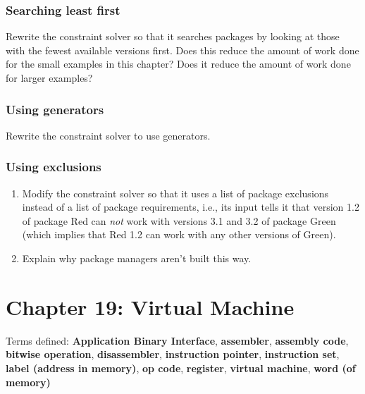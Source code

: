 \documentclass[krantzl]{krantz}
\newcommand{\glossref}[1]{\textbf{#1}}
\begin{document}
\subsection*{Searching least first}


Rewrite the constraint solver so that it searches packages
by looking at those with the fewest available versions first.
Does this reduce the amount of work done for the small examples in this chapter?
Does it reduce the amount of work done for larger examples?

\subsection*{Using generators}


Rewrite the constraint solver to use generators.

\subsection*{Using exclusions}

\begin{enumerate}

\item 

Modify the constraint solver so that
    it uses a list of package exclusions instead of a list of package requirements,
    i.e.,
    its input tells it that version 1.2 of package Red
    can \emph{not} work with versions 3.1 and 3.2 of package Green
    (which implies that Red 1.2 can work with any other versions of Green).



\item 

Explain why package managers aren't built this way.



\end{enumerate}

\chapter{Chapter 19: Virtual Machine}\label{virtual-machine}


\noindent 
    Terms defined:
    \glossref{Application Binary Interface}, \glossref{assembler}, \glossref{assembly code}, \glossref{bitwise operation}, \glossref{disassembler}, \glossref{instruction pointer}, \glossref{instruction set}, \glossref{label (address in memory)}, \glossref{op code}, \glossref{register}, \glossref{virtual machine}, \glossref{word (of memory)}
\end{document}
